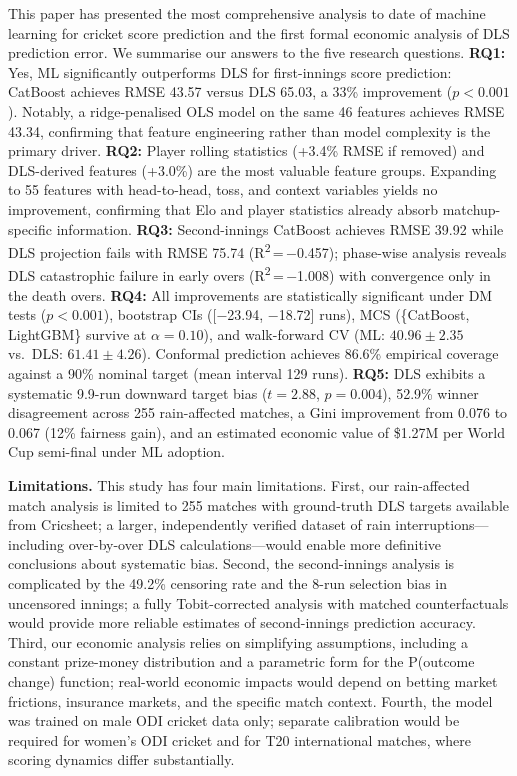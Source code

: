 \documentclass[10pt,a4paper,twocolumn]{article}
\begin{document}
This paper has presented the most comprehensive analysis to date of machine learning for cricket score prediction and the first formal economic analysis of DLS prediction error. We summarise our answers to the five research questions. \textbf{RQ1:} Yes, ML significantly outperforms DLS for first-innings score prediction: CatBoost achieves RMSE 43.57 versus DLS 65.03, a 33\% improvement ($p < 0.001$). Notably, a ridge-penalised OLS model on the same 46 features achieves RMSE 43.34, confirming that feature engineering rather than model complexity is the primary driver. \textbf{RQ2:} Player rolling statistics (+3.4\% RMSE if removed) and DLS-derived features (+3.0\%) are the most valuable feature groups. Expanding to 55 features with head-to-head, toss, and context variables yields no improvement, confirming that Elo and player statistics already absorb matchup-specific information. \textbf{RQ3:} Second-innings CatBoost achieves RMSE 39.92 while DLS projection fails with RMSE 75.74 (R\textsuperscript{2}\,=\,$-$0.457); phase-wise analysis reveals DLS catastrophic failure in early overs (R\textsuperscript{2}\,=\,$-$1.008) with convergence only in the death overs. \textbf{RQ4:} All improvements are statistically significant under DM tests ($p < 0.001$), bootstrap CIs ([$-$23.94, $-$18.72] runs), MCS (\{CatBoost, LightGBM\} survive at $\alpha=0.10$), and walk-forward CV (ML: $40.96 \pm 2.35$ vs.\ DLS: $61.41 \pm 4.26$). Conformal prediction achieves 86.6\% empirical coverage against a 90\% nominal target (mean interval 129 runs). \textbf{RQ5:} DLS exhibits a systematic 9.9-run downward target bias ($t=2.88$, $p=0.004$), 52.9\% winner disagreement across 255 rain-affected matches, a Gini improvement from 0.076 to 0.067 (12\% fairness gain), and an estimated economic value of \$1.27M per World Cup semi-final under ML adoption.

\textbf{Limitations.} This study has four main limitations. First, our rain-affected match analysis is limited to 255 matches with ground-truth DLS targets available from Cricsheet; a larger, independently verified dataset of rain interruptions---including over-by-over DLS calculations---would enable more definitive conclusions about systematic bias. Second, the second-innings analysis is complicated by the 49.2\% censoring rate and the 8-run selection bias in uncensored innings; a fully Tobit-corrected analysis with matched counterfactuals would provide more reliable estimates of second-innings prediction accuracy. Third, our economic analysis relies on simplifying assumptions, including a constant prize-money distribution and a parametric form for the P(outcome change) function; real-world economic impacts would depend on betting market frictions, insurance markets, and the specific match context. Fourth, the model was trained on male ODI cricket data only; separate calibration would be required for women's ODI cricket and for T20 international matches, where scoring dynamics differ substantially.
\end{document}
